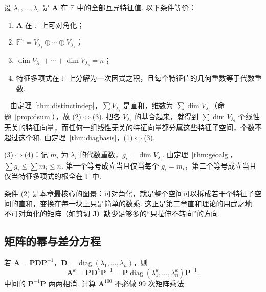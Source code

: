 \documentclass[lang=cn,10.5pt,scheme=chinese,toc=twocol,section,chinesefont=nofont,
twoside,citestyle=gb7714-2015,bibstyle=gb7714-2015]{elegantbook}
\DeclareRobustCommand{\textbf}[1]{{\lnsemiboldlatin\lnsemiboldcjk #1}}
\newcommand{\vv}[1]{\boldsymbol{#1}}
\numberwithin{equation}{section}   %
\newcommand{\diag}{\operatorname{diag}}
\newcommand*{\lnlabel}[1]{{\sffamily\bfseries\color{black}#1}}
\renewenvironment{proof}{%
	\par\noindent\lnlabel{\proofname}\;\ \color{black!90}\cfs}{\par}
\begin{document}
\begin{theorem}[对角化判据]\label{thm:diagcriterion}
  设 $\lambda_1,\ldots,\lambda_s$ 是 $\vv A$ 在 $\mathbb{F}$ 中的全部互异特征值. 以下条件等价：
  \begin{enumerate}
    \item $\vv A$ 在 $\mathbb{F}$ 上可对角化；
    \item $\mathbb{F}^n=V_{\lambda_1}\oplus\cdots\oplus V_{\lambda_s}$；
    \item $\dim V_{\lambda_1}+\cdots+\dim V_{\lambda_s}=n$；
    \item 特征多项式在 $\mathbb{F}$ 上分解为一次因式之积，且每个特征值的几何重数等于代数重数.
  \end{enumerate}
\end{theorem}
\begin{proof}
  由定理~\ref{thm:distinctindep}，$\sum V_{\lambda_i}$ 是直和，维数为 $\sum\dim V_{\lambda_i}$（命题~\ref{prop:dsum}），故 (2)$\Leftrightarrow$(3). 把各 $V_{\lambda_i}$ 的基合起来，就得到 $\sum\dim V_{\lambda_i}$ 个线性无关的特征向量，而任何一组线性无关的特征向量都分属这些特征子空间，个数不超过这个和. 由定理~\ref{thm:diagbasis}，(1)$\Leftrightarrow$(3).

  (3)$\Leftrightarrow$(4)：记 $m_i$ 为 $\lambda_i$ 的代数重数，$g_i=\dim V_{\lambda_i}$. 由定理~\ref{thm:geoalg}，$\sum g_i\le\sum m_i\le n$. 第一个等号成立当且仅当每个 $g_i=m_i$，第二个等号成立当且仅当特征多项式的根全在 $\mathbb{F}$ 中.
\end{proof}

\begin{motivebox}
  条件 (2) 是本章最核心的图景：\textbf{可对角化，就是整个空间可以拆成若干个特征子空间的直和}，变换在每一块上只是简单的数乘. 这正是第二章直和理论的用武之地. 不可对角化的矩阵（如剪切 $\vv J$）缺少足够多的“只拉伸不转向”的方向.
\end{motivebox}

\subsection{矩阵的幂与差分方程}

若 $\vv A=\vv P\vv D\vv P^{-1}$，$\vv D=\diag(\lambda_1,\ldots,\lambda_n)$，则
\[\vv A^k=\vv P\vv D^k\vv P^{-1}=\vv P\diag(\lambda_1^k,\ldots,\lambda_n^k)\vv P^{-1}.\]
中间的 $\vv P^{-1}\vv P$ 两两相消. 计算 $\vv A^{100}$ 不必做 $99$ 次矩阵乘法.
\end{document}
